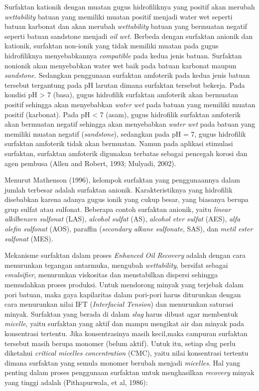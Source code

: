 \documentclass[
]{book}
\begin{document}
Surfaktan kationik dengan muatan gugus hidrofiliknya yang positif akan merubah \emph{wettability} batuan yang memiliki muatan positif menjadi water wet seperti batuan karbonat dan akan merubah \emph{wettability} batuan yang bermuatan negatif seperti batuan sandstone menjadi \emph{oil} \emph{wet.} Berbeda dengan surfaktan anionik dan kationik, surfaktan non-ionik yang tidak memiliki muatan pada gugus hidrofiliknya menyebabkannya \emph{compatible} pada kedua jenis batuan. Surfaktan nonionik akan menyebabkan water wet baik pada batuan karbonat maupun \emph{sandstone.} Sedangkan penggunaan surfaktan amfoterik pada kedua jenis batuan tersebut tergantung pada pH larutan dimana surfaktan tersebut bekerja. Pada kondisi pH \textgreater{} 7 (basa), gugus hidrofilik surfaktan amfoterik akan bermuatan positif sehingga akan menyebabkan \emph{water} \emph{wet} pada batuan yang memiliki muatan positif (karbonat). Pada pH \textless{} 7 (asam), gugus hidrofilik surfaktan amfoterik akan bermuatan negatif sehingga akan menyebabkan \emph{water} \emph{wet} pada batuan yang memiliki muatan negatif (\emph{sandstone}), sedangkan pada pH = 7, gugus hidrofilik surfaktan amfoterik tidak akan bermuatan. Namun pada aplikasi stimulasi surfaktan, surfaktan amfoterik digunakan terbatas sebagai pencegah korosi dan agen pembusa (Allen and Robert, 1993; Mulyadi, 2002).

Menurut Mathenson (1996), kelompok surfaktan yang penggunaannya dalam jumlah terbesar adalah surfaktan anionik. Karakteristiknya yang hidrofilik disebabkan karena adanya gugus ionik yang cukup besar, yang biasanya berupa grup sulfat atau sulfonat. Beberapa contoh surfaktan anionik, yaitu \emph{linear alkilbenzen sulfonat} (LAS), \emph{alcohol sulfat} (AS), \emph{alcohol eter sulfat} (AES), \emph{alfa olefin sulfonat} (AOS), paraffin (\emph{secondary alkane sulfonate}, SAS), dan \emph{metil ester sulfonat} (MES).

Mekanisme surfaktan dalam proses \emph{Enhanced Oil Recovery} adalah dengan cara menurunkan tegangan antarmuka, mengubah \emph{wettability}, bersifat sebagai \emph{emulsifier}, menurunkan viskositas dan menstabilkan dispersi sehingga memudahkan proses produksi. Untuk mendorong minyak yang terjebak dalam pori batuan, maka gaya kapilaritas dalam pori-pori harus diturunkan dengan cara menurunkan nilai IFT (\emph{Interfacial Tension}) dan menurunkan saturasi minyak. Surfaktan yang berada di dalam \emph{slug} harus dibuat agar membentuk \emph{micelle}, yaitu surfaktan yang aktif dan mampu mengikat air dan minyak pada konsentrasi tertentu. Jika konsentrasinya masih kecil,maka campuran surfaktan tersebut masih berupa monomer (belum aktif). Untuk itu, setiap slug perlu diketahui \emph{critical micelles concentration} (CMC), yaitu nilai konsentrasi tertentu dimana surfaktan yang semula monomer berubah menjadi \emph{micelles}. Hal yang penting dalam proses penggunaan surfaktan untuk menghasilkan \emph{recovery} minyak yang tinggi adalah (Pithapurwala, et al, 1986):
\end{document}
